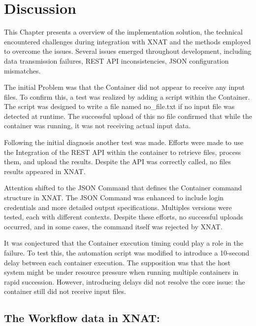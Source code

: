 \chapter{Discussion}
This Chapter presents a overview of the implementation solution, the technical encountered challenges during integration with XNAT and the methods employed to overcome the issues. Several issues emerged throughout development, including data transmission failures, REST API inconsistencies, JSON configuration mismatches.

The initial Problem was that the Container did not appear to receive any input files. To confirm this, a test was realized by adding a script within the Container. The script was designed to write a file named no\_file.txt if no input file was detected at runtime. The successful upload of this no file confirmed that while the container was running, it was not receiving actual input data.

Following the initial diagnosis another test was made. Efforts were made to use the Integration of the REST API within the container to retrieve files, process them, and upload the results.
Despite the API was correctly called, no files results appeared in XNAT. 

Attention shifted to the JSON Command that defines the Container command structure in XNAT. The JSON Command was enhanced to include login credentials and more detailed output specifications. Multiples versions were tested, each with different contexts. Despite these efforts, no successful uploads occurred, and in some cases, the command itself was rejected by XNAT. 

It was conjectured that the Container execution timing could play a role in the failure. To test this, the automation script was modified to introduce a 10-second delay between each container execution. The supposition was that the host system might be under resource pressure when running multiple containers in rapid succession. However, introducing delays did not resolve the core issue: the container still did not receive input files.

\section{The Workflow data in XNAT:}

